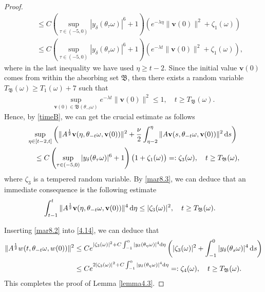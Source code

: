 \documentclass{elsarticle}
\theoremstyle{definition}
\numberwithin{equation}{section}
\renewcommand{\d}{{\rm{d}}}
\begin{document}
\begin{proof}
\begin{align*}
&\quad \leq    C\left (  \sup_{\tau\in (-5,0)}|y_\delta(\theta_\tau\omega)|^6+1\right)\left(e^{-\lambda  \eta}\|\textbf{v}(0)\|^2
 +   \zeta_1(\omega)   \right)
  \\
&\quad  \leq   C\left (  \sup_{\tau\in (-5,0)}|y_\delta(\theta_\tau\omega)|^6+1\right)\left(e^{-\lambda t}\|\textbf{v}(0)\|^2
 +   \zeta_1(\omega)   \right) ,
\end{align*}
where in the last inequality we have used $\eta\geq t-2$.
Since the initial value $\textbf{v}(0)$ comes from within the absorbing set $\mathfrak B$, then there exists a random variable $T_{\mathfrak B}(\omega) \geq T_1(\omega)+ 7$
such that
\begin{align} \label{timeB}
 \sup_{\textbf{v}(0)\in \mathfrak B(\theta_{-t} \omega)}  e^{-\lambda t} \|\textbf{v}(0)\|^2 \leq 1,\quad t\geq T_{\mathfrak B}(\omega).
\end{align}
Hence, by \eqref{timeB}, we can get   the crucial estimate as follows
\begin{align}
 &\sup_{\eta\in [t-2,t]}
  \left(
 \|A^{\frac12}\textbf{v} (\eta ,\theta_{-t } \omega, \textbf{v}(0)) \|^2
 + \frac{\nu}{2} \int_{\eta-2}^\eta  \|A\textbf{v} (s,\theta_{-t} \omega, \textbf{v}(0)) \|^2 \, \d s\right) \notag  \\
& \quad \leq  C\left (  \sup_{\tau\in (-5,0)}|y_\delta(\theta_\tau\omega)|^6+1\right)\big(1
 +   \zeta_1(\omega)   \big)
 =:  \zeta_3(\omega) ,\quad t\geq T_{\mathfrak B} (\omega) ,\label{mar8.3}
\end{align}
where    $ \zeta_3 $ is a tempered random variable. By \eqref{mar8.3}, we can deduce that
an immediate  consequence is the following estimate
\begin{align}\label{mar8.2}
  \int_{t-1}^t\|A^{\frac12}\textbf{v}(\eta,\theta_{-t}\omega,\textbf{v}(0))\|^4 \, \d \eta
&  \leq    |\zeta_3(\omega)|^2 ,  \quad t\geq T_{\mathfrak B} (\omega) .
\end{align}

 Inserting \eqref{mar8.2} into \eqref{4.14}, we can deduce that
\begin{align}  \label{mar8.4}
\|A^{\frac12}w(t,\theta_{-t}\omega,w(0))\|^2
&\leq Ce^{ |\zeta_3 (\omega)|^2+ C\int_{-1}^0|y_\delta(\theta_{\eta}\omega)|^4   \d \eta}  \left( |\zeta_3(\omega)|^2 + \int_{-1}^0 |y_\delta(\theta_{s}\omega)|^4 \,  \d s  \right) \nonumber \\
&\leq Ce^{ 2|\zeta_3 (\omega)|^2+ C\int_{-1}^0|y_\delta(\theta_{\eta}\omega)|^4   \d \eta}
=: \zeta_4(\omega) , \quad t\geq T_{\mathfrak B} (\omega) .
\nonumber
\end{align}
This completes the proof of Lemma \ref{lemma4.3}.
\end{proof}
\end{document}
